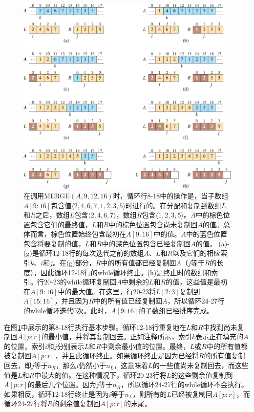 \documentclass[lang=cn,newtx,10pt,scheme=chinese]{elegantbook}
\begin{document}
\begin{figure}[htbp]
    \centering
    \includegraphics{算法导论第四版插图/第二章/归并过程示意图.pdf}
    \caption{在调用MERGE$(A,9,12,16)$时，循环行8-18中的操作是，当子数组$A[9:16]$包含值$\langle 2,4,6,7,1,2,3,5 \rangle$时进行的。在分配和复制到数组$L$和$R$之后，数组$L$包含$\langle 2,4,6,7 \rangle$，数组$R$包含$\langle 1,2,3,5 \rangle$。$A$中的棕色位置包含它们的最终值，$L$和$R$中的棕色位置包含尚未复制回$A$的值。总体而言，棕色位置始终包含最初在$A[9:16]$中的值。$A$中的蓝色位置包含将要复制的值，$L$和$R$中的深色位置包含已经复制回$A$的值。 (a)-(g)是循环12-18行的每次迭代之前的数组$A$、$L$和$R$以及它们的相应索引$k$、$i$和$j$。在(g)部分，$R$中的所有值都已经复制回$A$（$j$等于$R$的长度），因此循环12-18行的while循环终止。(h)是终止时的数组和索引。行20-23的while循环复制回$A$中剩余的$L$和$R$的值，这些值是最初在$A[9:16]$中的最大值。在这里，行20-23将$L[2:3]$复制到$A[15:16]$，并且因为$R$中的所有值已经复制回$A$，所以循环24-27行的while循环迭代0次。此时，$A[9:16]$的子数组已经排序完成。}
    \label{fig:归并过程示意图}
\end{figure}

在图\ref{fig:归并过程示意图}中展示的第8-18行执行基本步骤。循环12-18行重复地在$L$和$R$中找到尚未复制回$A[p:r]$的最小值，并将其复制回去。正如注释所示，索引$k$表示正在填充的$A$的位置，索引$i$和$j$分别表示$L$和$R$中剩余最小值的位置。最终，$L$或$R$中的所有值都被复制回$A[p:r]$，并且此循环终止。如果循环终止是因为已经将$R$的所有值复制回去，即$j$等于$n_R$，那么$i$仍然小于$n_L$，这意味着$L$的一些值尚未复制回去，而这些值是$L$和$R$中最大的值。在这种情况下，循环20-23行将$L$的这些剩余值复制到$A[p:r]$的最后几个位置。因为$j$等于$n_R$，所以循环24-27行的while循环不会执行。如果相反，循环12-18行终止是因为$i$等于$n_L$，则所有的$L$已经被复制回$A[p:r]$，而循环24-27行将$R$的剩余值复制回$A[p:r]$的末尾。
\end{document}
